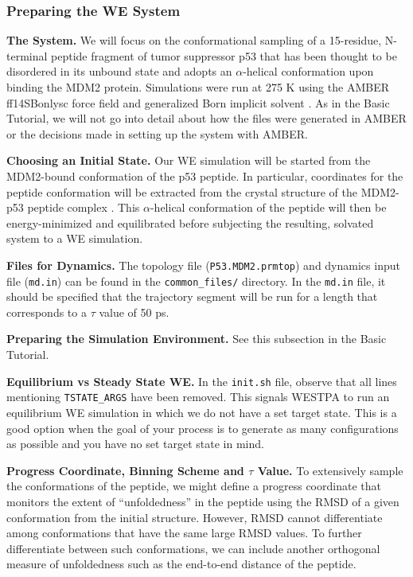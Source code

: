 \documentclass[9pt,tutorial]{livecoms}
\begin{document}
\subsubsection{Preparing the WE System}

\textbf{The System.} We will focus on  the conformational sampling of a 15-residue, N-terminal peptide fragment of tumor suppressor p53 that has been thought to be disordered in its unbound state and adopts an $\alpha$-helical conformation upon binding the MDM2 protein. 
Simulations were run at 275 K using the AMBER ff14SBonlysc force field \citep{ff} and generalized Born implicit solvent \citep{implicit_solvent}. 
As in the Basic Tutorial, we will not go into detail about how the files were generated in AMBER or the decisions made in setting up the system with AMBER.

\textbf{Choosing an Initial State.} Our WE simulation will be started from the MDM2-bound conformation of the p53 peptide. 
In particular, coordinates for the peptide conformation will be extracted from the crystal structure of the MDM2-p53 peptide complex \citep{Kussie1996}. 
This $\alpha$-helical conformation of the peptide will then be energy-minimized and equilibrated before subjecting the resulting, solvated system to a WE simulation.

\textbf{Files for Dynamics.} The topology file (\verb|P53.MDM2.prmtop|) and dynamics input file (\verb|md.in|) can be found in the \verb|common_files/| directory. 
In the \verb|md.in| file, it should be specified that the trajectory segment will be run for a length that corresponds to a $\tau$ value of 50 ps.

\textbf{Preparing the Simulation Environment.} See this subsection in the Basic Tutorial.

\textbf{Equilibrium vs Steady State WE.} In the \verb|init.sh| file, observe that all lines mentioning \verb|TSTATE_ARGS| have been removed. 
This signals WESTPA to run an equilibrium WE simulation in which we do not have a set target state. 
This is a good option when the goal of your process is to generate as many configurations as possible and you have no set target state in mind.

\textbf{Progress Coordinate, Binning Scheme and $\tau$ Value.} To extensively sample the conformations of the peptide, we might define a progress coordinate that monitors the extent of “unfoldedness” in the peptide using the RMSD of a given conformation from the initial structure. 
However, RMSD cannot differentiate among conformations that have the same large RMSD values. 
To further differentiate between such conformations, we can include another orthogonal measure of unfoldedness such as the end-to-end distance of the peptide. 
\end{document}
